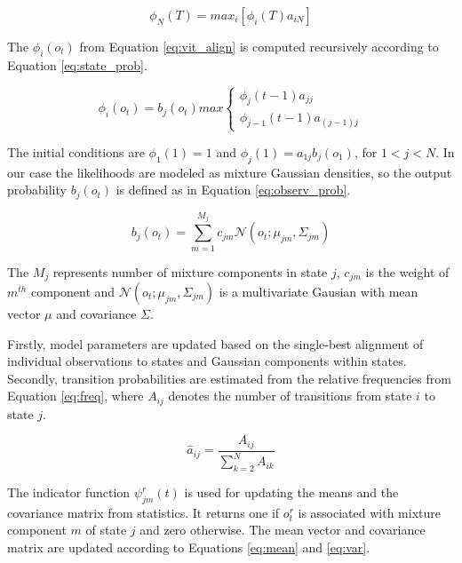\begin{equation}\label{eq:vit_align}
    \phi_N(T)= max_i[\phi_i(T)a_{iN}] 
\end{equation}


The $\phi_i(o_t)$ from Equation \ref{eq:vit_align} is computed recursively according to Equation \ref{eq:state_prob}.

\begin{equation}\label{eq:state_prob}
  \phi_i(o_t) = b_j(o_t) max \left\{
  \begin{array}{lr}
    \phi_j(t-1)a_{jj}\\
    \phi_{j-1}(t-1)a_{(j-1)j}
  \end{array}
  \right.
\end{equation}

The initial conditions are $\phi_1(1)=1$ and $\phi_j(1)= a_{1j}b_j(o_1)$, for $ 1 < j < N$. In our case the likelihoods are modeled as mixture Gaussian densities, so the output probability $b_j(o_t)$ is defined as in Equation \ref{eq:observ_prob}.

\begin{equation}\label{eq:observ_prob}
  b_j(o_t) = \sum_{m=1}^{M_j}{c_{jm}\mathcal{N}(o_t; \mu_{jm}, \Sigma_{jm})}
\end{equation}

The $M_j$ represents number of mixture components in state $j$, $c_{jm}$ is the weight of $m^{th}$ component and $\mathcal{N}(o_t; \mu_{jm}, \Sigma_{jm})$ is a multivariate Gausian with mean vector $\mu$ and covariance $\Sigma$.

Firstly, model parameters are updated based on the single-best alignment of individual observations to states and Gaussian components within states. Secondly, transition probabilities are estimated from the relative frequencies from Equation \ref{eq:freq}, where $A_{ij}$ denotes the number of transitions from state $i$ to state $j$.

\begin{equation}\label{eq:freq}
  \hat{a}_{ij} = \frac{A_{ij}}{\sum_{k=2}^{N}{A_{ik}}}
\end{equation}

The indicator function $\psi^r_{jm}(t)$ is used for updating the means and the covariance matrix from statistics. It returns one if $o^r_t$ is associated with mixture component $m$ of state $j$ and zero otherwise. The mean vector and covariance matrix are updated according to Equations \ref{eq:mean} and \ref{eq:var}.

